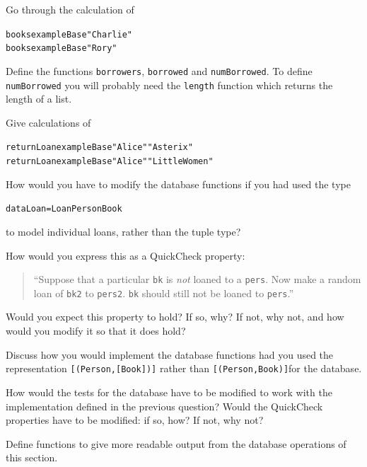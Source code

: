 \begin{exercises}
\item
Go through the calculation of
\begin{alltt}
books exampleBase "Charlie" 
books exampleBase "Rory"
\end{alltt}

\item
Define the functions \texttt{borrowers},
\texttt{borrowed} and \texttt{numBorrowed}. To define
\texttt{numBorrowed} you will probably need the
\texttt{length}
function which returns the length of a list.

\item
Give calculations of  
\begin{alltt}
returnLoan exampleBase "Alice" "Asterix"
returnLoan exampleBase "Alice" "Little Women"
\end{alltt}


\item
How would you have to modify the database functions if you had used the type
\begin{alltt}
data Loan = Loan Person Book
\end{alltt}
to model individual loans, rather than the tuple type?

\item
How would you express this as a QuickCheck property: \begin{quote}``Suppose that a particular \texttt{bk} is \emph{not} loaned to a \texttt{pers}. Now make a random loan of \texttt{bk2} to \texttt{pers2}. \texttt{bk} should still not be loaned to \texttt{pers}.''\end{quote}
Would you expect this property to hold? If so, why? If not, why not, and how would you modify it so that it does hold?


\item
Discuss how you would implement the database functions had you used
the representation \texttt{[(Person,[Book])]} rather than
\texttt{[(Person,Book)]}for the database.

\item
How would the tests for the database have to be modified to work with the implementation defined in the previous question? Would the QuickCheck properties have to be modified: if so, how? If not, why not?


\item
Define functions to give more readable output from the database
operations of this section.


\end{exercises}











